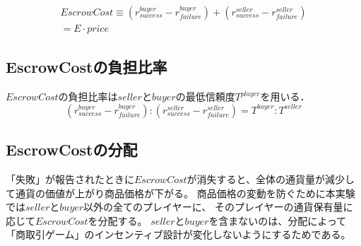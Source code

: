 \begin{equation}
  \begin{split}
    EscrowCost \equiv (r^{buyer}_{success} - r^{buyer}_{failure}) + (r^{seller}_{success} - r^{seller}_{failure}) \\
    = E \cdot price
  \end{split}
\end{equation}

\subsection{EscrowCostの負担比率}
$ EscrowCost $の負担比率は$ seller $と$ buyer $の最低信頼度$ T^{player} $を用いる．\\

\begin{equation}
  (r^{buyer}_{success} - r^{buyer}_{failure}):(r^{seller}_{success} - r^{seller}_{failure}) = T^{buyer}:T^{seller}
\end{equation}

\subsection{EscrowCostの分配}
「失敗」が報告されたときに$ EscrowCost $が消失すると、全体の通貨量が減少して通貨の価値が上がり商品価格が下がる。
商品価格の変動を防ぐために本実験では$seller$と$buyer$以外の全てのプレイヤーに、
そのプレイヤーの通貨保有量に応じて$ EscrowCost $を分配する。
$seller$と$buyer$を含まないのは、分配によって「商取引ゲーム」のインセンティブ設計が変化しないようにするためである。





